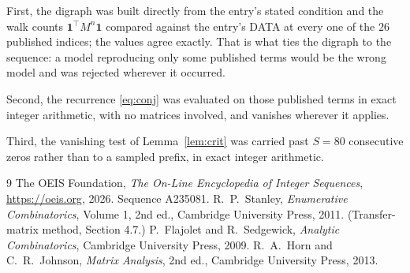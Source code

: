 \documentclass[11pt,a4paper]{article}
\theoremstyle{plain}
\theoremstyle{definition}
\begin{document}
First, the digraph was built directly from the entry's stated condition and the walk counts
$\mathbf{1}^{\!\top}M^{n}\mathbf{1}$ compared against the entry's DATA at every one of
the $26$ published indices; the values agree exactly. That is what ties the digraph to
the sequence: a model reproducing only some published terms would be the wrong model and
was rejected wherever it occurred.

Second, the recurrence \eqref{eq:conj} was evaluated on those published terms in exact
integer arithmetic, with no matrices involved, and vanishes wherever it applies.

Third, the vanishing test of Lemma~\ref{lem:crit} was carried past $S=80$ consecutive
zeros rather than to a sampled prefix, in exact integer arithmetic.

\begin{thebibliography}{9}
 The OEIS Foundation, \emph{The On-Line Encyclopedia of Integer
Sequences}, \url{https://oeis.org}, 2026. Sequence A235081.
 R.~P.~Stanley, \emph{Enumerative Combinatorics}, Volume 1, 2nd ed.,
Cambridge University Press, 2011. (Transfer-matrix method, Section 4.7.)
 P.~Flajolet and R.~Sedgewick, \emph{Analytic Combinatorics}, Cambridge
University Press, 2009.
 R.~A.~Horn and C.~R.~Johnson, \emph{Matrix Analysis}, 2nd ed., Cambridge
University Press, 2013.
\end{thebibliography}
\end{document}
